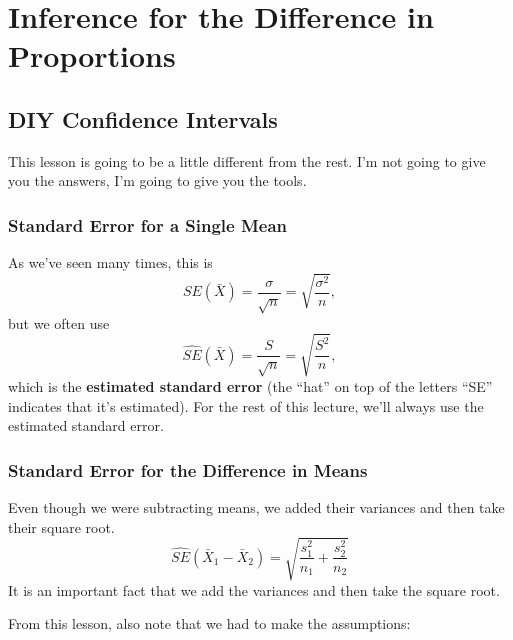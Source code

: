 \documentclass[
  letterpaper,
  DIV=11,
  numbers=noendperiod]{scrreprt}
\begin{document}
\hypertarget{inference-for-the-difference-in-proportions}{%
\chapter{Inference for the Difference in
Proportions}\label{inference-for-the-difference-in-proportions}}

\hypertarget{diy-confidence-intervals}{%
\section{DIY Confidence Intervals}\label{diy-confidence-intervals}}

This lesson is going to be a little different from the rest. I'm not
going to give you the answers, I'm going to give you the tools.

\hypertarget{standard-error-for-a-single-mean}{%
\subsection{Standard Error for a Single
Mean}\label{standard-error-for-a-single-mean}}

As we've seen many times, this is \[
SE(\bar X) = \frac{\sigma}{\sqrt{n}} = \sqrt{\frac{\sigma^2}{n}},
\] but we often use \[
\hat{SE}(\bar X) = \frac{S}{\sqrt{n}} = \sqrt{\frac{S^2}{n}},
\] which is the \textbf{estimated standard error} (the ``hat'' on top of
the letters ``SE'' indicates that it's estimated). For the rest of this
lecture, we'll always use the estimated standard error.

\hypertarget{standard-error-for-the-difference-in-means}{%
\subsection{Standard Error for the Difference in
Means}\label{standard-error-for-the-difference-in-means}}

Even though we were subtracting means, we added their variances and then
take their square root. \[
\hat{SE}(\bar X_1 - \bar X_2) = \sqrt{\frac{s_1^2}{n_1} + \frac{s_2^2}{n_2}}
\] It is an important fact that we add the variances and then take the
square root.

From this lesson, also note that we had to make the assumptions:
\end{document}
